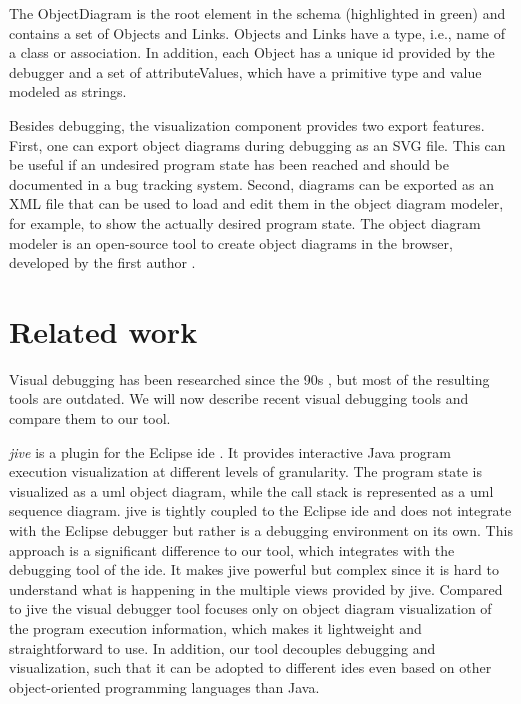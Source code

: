 \documentclass[conference]{IEEEtran}
\begin{document}
The \textsf{ObjectDiagram} is the root element in the schema (highlighted in green) and contains a set of \textsf{Objects} and \textsf{Links}.
\textsf{Objects} and \textsf{Links} have a \textsf{type}, i.e., name of a class or association.
In addition, each \textsf{Object} has a unique id provided by the debugger and a set of \textsf{attributeValues}, which have a primitive \textsf{type} and \textsf{value} modeled as strings.

Besides debugging, the visualization component provides two export features.
First, one can export object diagrams during debugging as an SVG file.
This can be useful if an undesired program state has been reached and should be documented in a bug tracking system.
Second, diagrams can be exported as an XML file that can be used to load and edit them in the object diagram modeler, for example, to show the actually desired program state.
The object diagram modeler is an open-source tool to create object diagrams in the browser, developed by the first author \cite{ObjectDiagramModeler2022}.

\section{Related work} \label{sec:relatedWork}
Visual debugging has been researched since the 90s \cite{baeza-yatesVisualDebuggingAutomatic1996, jerdingUsingVisualizationFoster1994, mukherjeaVisualDebuggingIntegrating1994, hansonSimpleExtensibleGraphical1997}, but most of the resulting tools are outdated.
We will now describe recent visual debugging tools and compare them to our tool.

\textit{\gls*{jive}} is a plugin for the Eclipse \gls*{ide} \cite{czyzDeclarativeVisualDebugging2007,k.p.FiniteStateModel2021, JIVEJavaInteractive}.
It provides interactive Java program execution visualization at different levels of granularity.
The program state is visualized as a \gls*{uml} object diagram, while the call stack is represented as a \gls*{uml} sequence diagram.
\gls*{jive} is tightly coupled to the Eclipse \gls*{ide} and does not integrate with the Eclipse debugger but rather is a debugging environment on its own.
This approach is a significant difference to our tool, which integrates with the debugging tool of the \gls*{ide}.
It makes \gls*{jive} powerful but complex since it is hard to understand what is happening in the multiple views provided by \gls*{jive}.
Compared to \gls*{jive} the visual debugger tool focuses only on object diagram visualization of the program execution information, which makes it lightweight and straightforward to use.
In addition, our tool decouples debugging and visualization, such that it can be adopted to different \glspl*{ide} even based on other object-oriented programming languages than Java.
\end{document}
